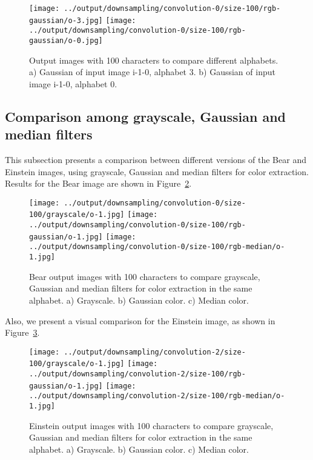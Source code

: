 \documentclass[]{IEEEtran}
\begin{document}
\begin{figure}[H]
    \centering
    \texttt{[image: ../output/downsampling/convolution-0/size-100/rgb-gaussian/o-3.jpg]}
    \texttt{[image: ../output/downsampling/convolution-0/size-100/rgb-gaussian/o-0.jpg]}
    \caption{Output images with 100 characters to compare different alphabets. a) Gaussian of input image i-1-0, alphabet 3. b) Gaussian of input image i-1-0, alphabet 0.}
    \label{fig:alphabets-colored-100}
\end{figure}

\subsection{Comparison among grayscale, Gaussian and median filters}

This subsection presents a comparison between different versions of the Bear and Einstein images, using grayscale, Gaussian and median filters for color extraction. Results for the Bear image are shown in Figure~\ref{fig:bear-100}.

\begin{figure}[H]
    \centering
    \texttt{[image: ../output/downsampling/convolution-0/size-100/grayscale/o-1.jpg]}
    \texttt{[image: ../output/downsampling/convolution-0/size-100/rgb-gaussian/o-1.jpg]}
    \texttt{[image: ../output/downsampling/convolution-0/size-100/rgb-median/o-1.jpg]}
    \caption{Bear output images with 100 characters to compare grayscale,  Gaussian and median filters for color extraction in the same alphabet. a) Grayscale. b) Gaussian color. c) Median color.}
    \label{fig:bear-100}
\end{figure}

Also, we present a visual comparison for the Einstein image, as shown in Figure~\ref{fig:einstein-100}.

\begin{figure}[H]
    \centering
    \texttt{[image: ../output/downsampling/convolution-2/size-100/grayscale/o-1.jpg]}
    \texttt{[image: ../output/downsampling/convolution-2/size-100/rgb-gaussian/o-1.jpg]}
    \texttt{[image: ../output/downsampling/convolution-2/size-100/rgb-median/o-1.jpg]}
    \caption{Einstein output images with 100 characters to compare grayscale,  Gaussian and median filters for color extraction in the same alphabet. a) Grayscale. b) Gaussian color. c) Median color.}
    \label{fig:einstein-100}
\end{figure}
\end{document}
